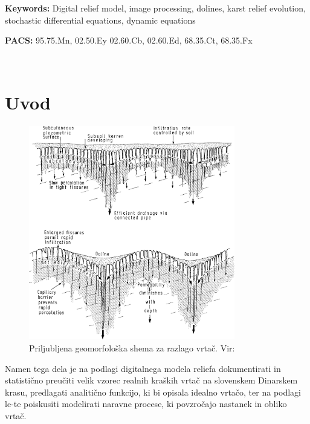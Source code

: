 \documentclass[a4paper, twoside, 12pt]{book}
\begin{document}
\vspace*{1cm}

\noindent \textbf{Keywords:} Digital relief model, image processing, dolines, karst relief evolution, stochastic differential equations, dynamic equations
\smallskip

\noindent \textbf{PACS:} 95.75.Mn, 02.50.Ey 02.60.Cb, 02.60.Ed, 68.35.Ct, 68.35.Fx


\newpage
\ \thispagestyle{empty}

        \mainmatter
        \setcounter{page}{1}
        \pagestyle{fancy}
        \rhead{\thepage}


        \chapter{Uvod}
        \label{uvod}

        \begin{figure}[h]
          \begin{center}
            \includegraphics[width=9cm]{slike/vrtaca-ford-williams}
          \end{center}
          \caption{Priljubljena geomorfološka shema za razlago vrtač. Vir: \cite{ford2007karst}}
          \label{fig:vrtaca-ford-williams}
        \end{figure}

        Namen tega dela je na podlagi digitalnega modela reliefa dokumentirati in statistično preučiti velik vzorec realnih kraških vrtač na slovenskem Dinarskem krasu, predlagati analitično funkcijo, ki bi opisala idealno vrtačo, ter na podlagi le-te poiskusiti modelirati naravne procese, ki povzročajo nastanek in obliko vrtač.
\end{document}
